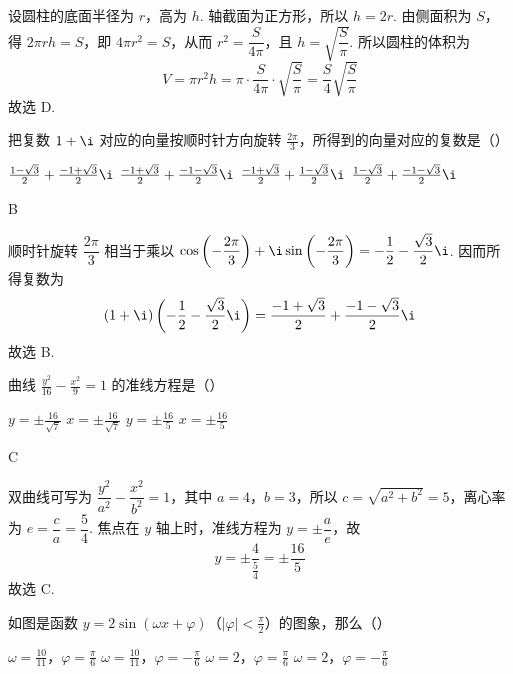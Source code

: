 \begin{solution}
设圆柱的底面半径为 \(r\)，高为 \(h\). 轴截面为正方形，所以 \(h=2r\). 由侧面积为 \(S\)，得 \(2\pi rh=S\)，即 \(4\pi r^2=S\)，从而 \(r^2=\dfrac{S}{4\pi}\)，且 \(h=\sqrt{\dfrac{S}{\pi}}\). 所以圆柱的体积为
\[
V=\pi r^2h=\pi\cdot\frac{S}{4\pi}\cdot\sqrt{\frac{S}{\pi}}=\frac{S}{4}\sqrt{\frac{S}{\pi}}
\]
故选 D.
\end{solution}


\begin{problem}
把复数 \(1+\i\) 对应的向量按顺时针方向旋转 \(\frac{2\pi}{3}\)，所得到的向量对应的复数是（\quad）

\choices
    {\(\frac{1-\sqrt{3}}{2}+\frac{-1+\sqrt{3}}{2}\i\)}
    {\(\frac{-1+\sqrt{3}}{2}+\frac{-1-\sqrt{3}}{2}\i\)}
    {\(\frac{-1+\sqrt{3}}{2}+\frac{1-\sqrt{3}}{2}\i\)}
    {\(\frac{1-\sqrt{3}}{2}+\frac{-1-\sqrt{3}}{2}\i\)}
\end{problem}

\begin{answer}B\end{answer}

\begin{solution}
顺时针旋转 \(\dfrac{2\pi}{3}\) 相当于乘以 \(\cos\left(-\dfrac{2\pi}{3}\right)+\i\sin\left(-\dfrac{2\pi}{3}\right)=-\dfrac12-\dfrac{\sqrt3}{2}\i\). 因而所得复数为
\[
(1+\i)\left(-\frac12-\frac{\sqrt3}{2}\i\right)=\frac{-1+\sqrt3}{2}+\frac{-1-\sqrt3}{2}\i
\]
故选 B.
\end{solution}


\begin{problem}
曲线 \(\frac{y^2}{16}-\frac{x^2}{9}=1\) 的准线方程是（\quad）

\choices
    {\(y=\pm \frac{16}{\sqrt{7}}\)}
    {\(x=\pm \frac{16}{\sqrt{7}}\)}
    {\(y=\pm \frac{16}{5}\)}
    {\(x=\pm \frac{16}{5}\)}
\end{problem}

\begin{answer}C\end{answer}

\begin{solution}
双曲线可写为 \(\dfrac{y^2}{a^2}-\dfrac{x^2}{b^2}=1\)，其中 \(a=4\)，\(b=3\)，所以 \(c=\sqrt{a^2+b^2}=5\)，离心率为 \(e=\dfrac{c}{a}=\dfrac54\). 焦点在 \(y\) 轴上时，准线方程为 \(y=\pm\dfrac{a}{e}\)，故
\[
y=\pm\frac{4}{\frac{5}{4}}=\pm\frac{16}{5}
\]
故选 C.
\end{solution}

\begin{problem}
如图是函数 \(y=2\sin\left( \omega x+\varphi \right)\)（\(\left| \varphi \right|<\frac{\pi}{2}\)）的图象，那么（\quad）


\choices
    {\(\omega=\frac{10}{11}\)，\(\varphi=\frac{\pi}{6}\)}
    {\(\omega=\frac{10}{11}\)，\(\varphi=-\frac{\pi}{6}\)}
    {\(\omega=2\)，\(\varphi=\frac{\pi}{6}\)}
    {\(\omega=2\)，\(\varphi=-\frac{\pi}{6}\)}
\end{problem}

